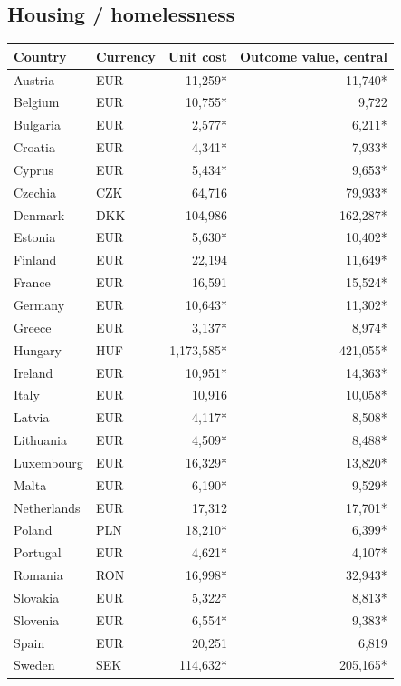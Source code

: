 \subsection*{Housing / homelessness}
\begin{longtable}{llrr}
\toprule
Country & Currency & Unit cost & Outcome value, central \\
\midrule
\endhead
Austria & EUR & 11,259* & 11,740* \\
Belgium & EUR & 10,755* & 9,722 \\
Bulgaria & EUR & 2,577* & 6,211* \\
Croatia & EUR & 4,341* & 7,933* \\
Cyprus & EUR & 5,434* & 9,653* \\
Czechia & CZK & 64,716 & 79,933* \\
Denmark & DKK & 104,986 & 162,287* \\
Estonia & EUR & 5,630* & 10,402* \\
Finland & EUR & 22,194 & 11,649* \\
France & EUR & 16,591 & 15,524* \\
Germany & EUR & 10,643* & 11,302* \\
Greece & EUR & 3,137* & 8,974* \\
Hungary & HUF & 1,173,585* & 421,055* \\
Ireland & EUR & 10,951* & 14,363* \\
Italy & EUR & 10,916 & 10,058* \\
Latvia & EUR & 4,117* & 8,508* \\
Lithuania & EUR & 4,509* & 8,488* \\
Luxembourg & EUR & 16,329* & 13,820* \\
Malta & EUR & 6,190* & 9,529* \\
Netherlands & EUR & 17,312 & 17,701* \\
Poland & PLN & 18,210* & 6,399* \\
Portugal & EUR & 4,621* & 4,107* \\
Romania & RON & 16,998* & 32,943* \\
Slovakia & EUR & 5,322* & 8,813* \\
Slovenia & EUR & 6,554* & 9,383* \\
Spain & EUR & 20,251 & 6,819 \\
Sweden & SEK & 114,632* & 205,165* \\
\bottomrule
\end{longtable}
